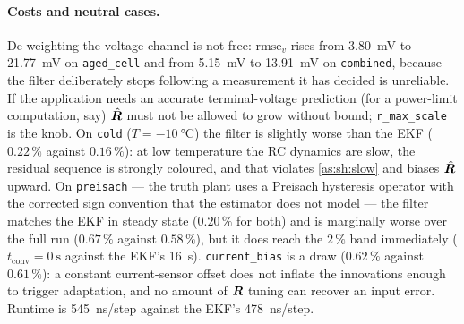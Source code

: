 \paragraph{Costs and neutral cases.}  De-weighting the voltage channel is not free: $\mathrm{rmse}_v$
rises from \SI{3.80}{\milli\volt} to \SI{21.77}{\milli\volt} on \texttt{aged\_cell} and from
\SI{5.15}{\milli\volt} to \SI{13.91}{\milli\volt} on \texttt{combined}, because the filter
deliberately stops following a measurement it has decided is unreliable.  If the application needs an
accurate terminal-voltage prediction (for a power-limit computation, say) $\hat{\bm{R}}$ must not be
allowed to grow without bound; \texttt{r\_max\_scale} is the knob.  On \texttt{cold}
($T=\SI{-10}{\celsius}$) the filter is slightly worse than the EKF ($0.22\,\%$ against $0.16\,\%$):
at low temperature the RC dynamics are slow, the residual sequence is strongly coloured, and that
violates \cref{as:sh:slow} and biases $\hat{\bm{R}}$ upward.  On \texttt{preisach} --- the truth plant
uses a Preisach hysteresis operator with the corrected sign convention that the estimator does not
model --- the filter matches the EKF in steady state ($0.20\,\%$ for both) and is marginally worse
over the full run ($0.67\,\%$ against $0.58\,\%$), but it does reach the $2\,\%$ band immediately
($t_\mathrm{conv}=\SI{0}{\second}$ against the EKF's \SI{16}{\second}).  \texttt{current\_bias} is a
draw ($0.62\,\%$ against $0.61\,\%$): a constant current-sensor offset does not inflate the
innovations enough to trigger adaptation, and no amount of $\bm{R}$ tuning can recover an input error.
Runtime is \SI{545}{\nano\second}/step against the EKF's \SI{478}{\nano\second}/step.

